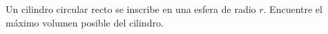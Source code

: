 \item Un cilindro circular recto se inscribe en una esfera de radio $r$. Encuentre el máximo volumen posible del cilindro.
